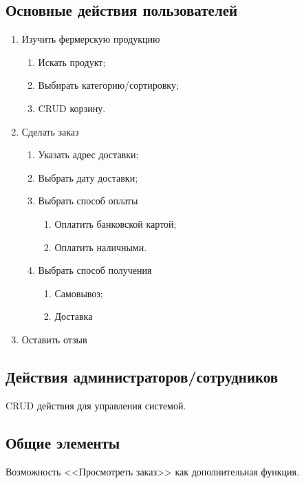\documentclass[a4paper]{report}
\begin{document}
\subsection*{Основные действия пользователей}
\begin{enumerate}
    \item Изучить фермерскую продукцию\begin{enumerate}
        \item Искать продукт;
        \item Выбирать категорию/сортировку;
        \item CRUD корзину.
    \end{enumerate}
    \item Сделать заказ\begin{enumerate}
        \item Указать адрес доставки;
        \item Выбрать дату доставки;
        \item Выбрать способ оплаты\begin{enumerate}
            \item Оплатить банковской картой;
            \item Оплатить наличными.
        \end{enumerate}
        \item Выбрать способ получения\begin{enumerate}
            \item Самовывоз;
            \item Доставка
        \end{enumerate}
    \end{enumerate}
    \item Оставить отзыв
\end{enumerate}
\subsection*{Действия администраторов/сотрудников}
CRUD действия для управления системой.
\subsection*{Общие элементы}
Возможность <<Просмотреть заказ>> как дополнительная функция.
\newpage
\end{document}
